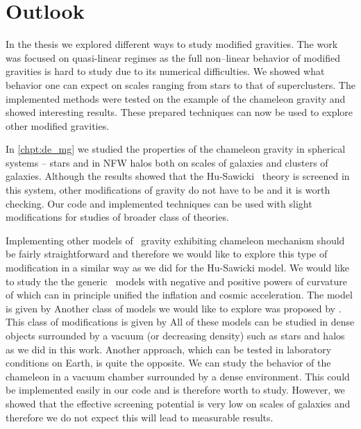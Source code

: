 \chapter{Outlook}
\label{chpt:outlook}
In the thesis we explored different ways to study modified gravities. The work was focused on quasi-linear regimes as the full non--linear behavior of modified gravities is hard to study due to its numerical difficulties. We showed what behavior one can expect on scales ranging from stars to that of superclusters. The implemented methods were tested on the example of the chameleon gravity and showed interesting results. These prepared techniques can now be used to explore other modified gravities.

In \autoref{chpt:de_mg} we studied the properties of the chameleon gravity in spherical systems -- stars and in NFW halos both on scales of galaxies and clusters of galaxies. Although the results showed that the Hu-Sawicki \fR\ theory is screened in this system, other modifications of gravity do not have to be and it is worth checking. Our code and implemented techniques can be used with slight modifications for studies of broader class of theories.

Implementing other models of \fR\ gravity exhibiting chameleon mechanism should be fairly straightforward and therefore we would like to explore this type of modification in a similar way as we did for the Hu-Sawicki model. We would like to study the the generic \fR\ models with negative and positive powers of curvature of \textcite{2003PhRvD..68l3512N} which can in principle unified the inflation and cosmic acceleration. The model is given by
Another class of models we would like to explore was proposed by \textcite{2007JETPL..86..157S}. This class of modifications is given by
All of these models can be studied in dense objects surrounded by a vacuum (or decreasing density) such as stars and halos as we did in this work. Another approach, which can be tested in laboratory conditions on Earth, is quite the opposite. We can study the behavior of the chameleon in a vacuum chamber surrounded by a dense environment. This could be implemented easily in our code and is therefore worth to study. However, we showed that the effective screening potential is very low on scales of galaxies and therefore we do not expect this will lead to measurable results.

